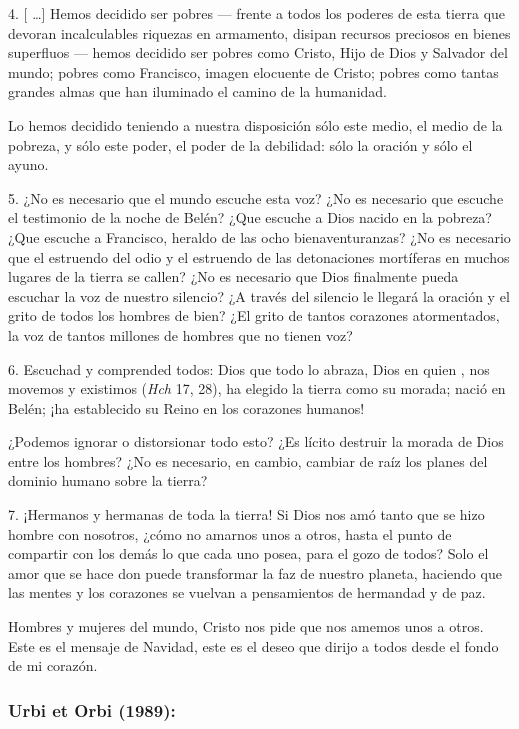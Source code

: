 \begin{body}
	4. {[} \ldots{}{]} Hemos decidido ser pobres --- frente a todos los poderes de esta tierra que devoran incalculables riquezas en armamento, disipan recursos preciosos en bienes superfluos --- hemos decidido ser pobres como Cristo, Hijo de Dios y Salvador del mundo; pobres como Francisco, imagen elocuente de Cristo; pobres como tantas grandes almas que han iluminado el camino de la humanidad.
	
	Lo hemos decidido teniendo a nuestra disposición sólo este medio, el medio de la pobreza, y sólo este poder, el poder de la debilidad: sólo la oración y sólo el ayuno.
	
	5. ¿No es necesario que el mundo escuche esta voz? ¿No es necesario que escuche el testimonio de la noche de Belén? ¿Que escuche a Dios nacido en la pobreza? ¿Que escuche a Francisco, heraldo de las ocho bienaventuranzas? ¿No es necesario que el estruendo del odio y el estruendo de las detonaciones mortíferas en muchos lugares de la tierra se callen? ¿No es necesario que Dios finalmente pueda escuchar la voz de nuestro silencio? ¿A través del silencio le llegará la oración y el grito de todos los hombres de bien? ¿El grito de tantos corazones atormentados, la voz de tantos millones de hombres que no tienen voz?
	
	6. Escuchad y comprended todos: Dios que todo lo abraza, Dios en quien , nos movemos y existimos (\emph{Hch} 17, 28), ha elegido la tierra como su morada; nació en Belén; ¡ha establecido su Reino en los corazones humanos!
	
	¿Podemos ignorar o distorsionar todo esto? ¿Es lícito destruir la morada de Dios entre los hombres? ¿No es necesario, en cambio, cambiar de raíz los planes del dominio humano sobre la tierra?
	
	7. ¡Hermanos y hermanas de toda la tierra! Si Dios nos amó tanto que se hizo hombre con nosotros, ¿cómo no amarnos unos a otros, hasta el punto de compartir con los demás lo que cada uno posea, para el gozo de todos? Solo el amor que se hace don puede transformar la faz de nuestro planeta, haciendo que las mentes y los corazones se vuelvan a pensamientos de hermandad y de paz.
	
	Hombres y mujeres del mundo, Cristo nos pide que nos amemos unos a otros. Este es el mensaje de Navidad, este es el deseo que dirijo a todos desde el fondo de mi corazón.
\end{body}


\subsubsection{Urbi et Orbi (1989):}


